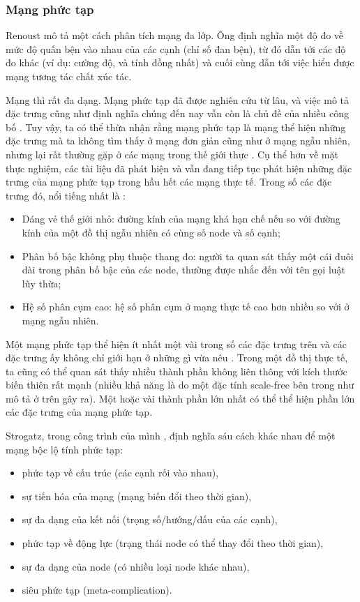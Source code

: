 \documentclass[12pt,a4paper, openany]{book}
\begin{document}
\subsubsection{Mạng phức tạp}

Renoust \cite{renoust2014} mô tả một cách phân tích mạng đa lớp. Ông định nghĩa một độ đo về mức độ quấn bện vào nhau của các cạnh (chỉ số đan bện), từ đó dẫn tới các độ đo khác (ví dụ: cường độ, và tính đồng nhất) và cuối cùng dẫn tới việc hiểu được mạng tương tác chất xúc tác.

Mạng thì rất đa dạng. Mạng phức tạp đã được nghiên cứu từ lâu, và việc mô tả đặc trưng cũng như định nghĩa chúng đến nay vẫn còn là chủ đề của nhiều công bố \cite{costa2007,kim2008}. Tuy vậy, ta có thể thừa nhận rằng mạng phức tạp là mạng thể hiện những đặc trưng mà ta không tìm thấy ở mạng đơn giản cũng như ở mạng ngẫu nhiên, nhưng lại rất thường gặp ở các mạng trong thế giới thực \cite{watts1998}. Cụ thể hơn về mặt thực nghiệm, các tài liệu đã phát hiện \cite{albert2002} và vẫn đang tiếp tục phát hiện \cite{pagani2013} những đặc trưng của mạng phức tạp trong hầu hết các mạng thực tế. Trong số các đặc trưng đó, nổi tiếng nhất là \cite{albert2002}:

\begin{itemize}
    \item Dáng vẻ thế giới nhỏ: đường kính của mạng khá hạn chế nếu so với đường kính của một đồ thị ngẫu nhiên có cùng số node và số cạnh;
    \item Phân bố bậc không phụ thuộc thang đo: người ta quan sát thấy một cái đuôi dài trong phân bố bậc của các node, thường được nhắc đến với tên gọi luật lũy thừa;
    \item Hệ số phân cụm cao: hệ số phân cụm ở mạng thực tế cao hơn nhiều so với ở mạng ngẫu nhiên.
\end{itemize}

Một mạng phức tạp thể hiện ít nhất một vài trong số các đặc trưng trên và các đặc trưng ấy không chỉ giới hạn ở những gì vừa nêu \cite{claussen2008}. Trong một đồ thị thực tế, ta cũng có thể quan sát thấy nhiều thành phần không liên thông với kích thước biến thiên rất mạnh (nhiều khả năng là do một đặc tính scale-free bên trong như mô tả ở trên gây ra). Một hoặc vài thành phần lớn nhất có thể thể hiện phần lớn các đặc trưng của mạng phức tạp.

Strogatz, trong công trình của mình \cite{strogatz2001}, định nghĩa sáu cách khác nhau để một mạng bộc lộ tính phức tạp:

\begin{itemize}
    \item phức tạp về cấu trúc (các cạnh rối vào nhau),
    \item sự tiến hóa của mạng (mạng biến đổi theo thời gian),
    \item sự đa dạng của kết nối (trọng số/hướng/dấu của các cạnh),
    \item phức tạp về động lực (trạng thái node có thể thay đổi theo thời gian),
    \item sự đa dạng của node (có nhiều loại node khác nhau),
    \item siêu phức tạp (meta-complication).
\end{itemize}
\end{document}
